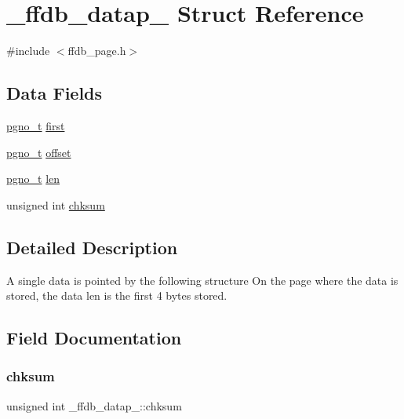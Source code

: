 \hypertarget{struct__ffdb__datap__}{}\section{\+\_\+ffdb\+\_\+datap\+\_\+ Struct Reference}
\label{struct__ffdb__datap__}


{\ttfamily \#include $<$ffdb\+\_\+page.\+h$>$}

\subsection*{Data Fields}
\begin{DoxyCompactItemize}
\item 
\mbox{\hyperlink{adat-devel_2other__libs_2filedb_2filehash_2ffdb__db_8h_a000813331643d38481142bcce7de1501}{pgno\+\_\+t}} \mbox{\hyperlink{struct__ffdb__datap___a45bb4391f88d605103aaf0f61a10f349}{first}}
\item 
\mbox{\hyperlink{adat-devel_2other__libs_2filedb_2filehash_2ffdb__db_8h_a000813331643d38481142bcce7de1501}{pgno\+\_\+t}} \mbox{\hyperlink{struct__ffdb__datap___a27c6fdcb05f89592016f8f8cc141560a}{offset}}
\item 
\mbox{\hyperlink{adat-devel_2other__libs_2filedb_2filehash_2ffdb__db_8h_a000813331643d38481142bcce7de1501}{pgno\+\_\+t}} \mbox{\hyperlink{struct__ffdb__datap___aec2dc3a3454339039f0c12598e3faad7}{len}}
\item 
unsigned int \mbox{\hyperlink{struct__ffdb__datap___a69c8dca32c4bb1d91f0fff9409c0a13f}{chksum}}
\end{DoxyCompactItemize}


\subsection{Detailed Description}
A single data is pointed by the following structure On the page where the data is stored, the data len is the first 4 bytes stored. 

\subsection{Field Documentation}
\mbox{\label{struct__ffdb__datap___a69c8dca32c4bb1d91f0fff9409c0a13f}} 
\subsubsection{\texorpdfstring{chksum}{chksum}}
{\footnotesize\ttfamily unsigned int \+\_\+ffdb\+\_\+datap\+\_\+\+::chksum}

